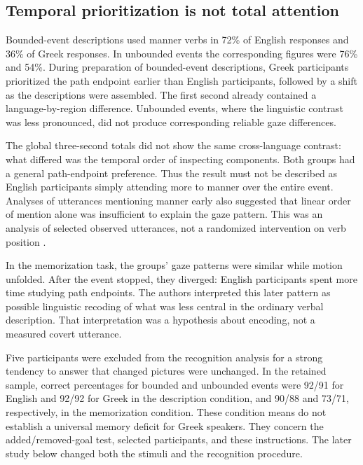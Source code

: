 \subsection{Temporal prioritization is not total attention}

Bounded-event descriptions used manner verbs in 72\% of English responses
and 36\% of Greek responses. In unbounded events the corresponding figures
were 76\% and 54\%. During preparation of bounded-event descriptions,
Greek participants prioritized the path endpoint earlier than English
participants, followed by a shift as the descriptions were assembled.
The first second already contained a language-by-region difference.
Unbounded events, where the linguistic contrast was less pronounced,
did not produce corresponding reliable gaze differences.

The global three-second totals did not show the same cross-language
contrast: what differed was the temporal order of inspecting components.
Both groups had a general path-endpoint preference. Thus the result must
not be described as English participants simply attending more to manner
over the entire event. Analyses of utterances mentioning manner early
also suggested that linear order of mention alone was insufficient to
explain the gaze pattern. This was an analysis of selected observed
utterances, not a randomized intervention on verb position
\cite[pp.~166--177,Table~1,Figs.~2--7]{PapafragouHulbertTrueswell2008EventPerceptionLC}.

In the memorization task, the groups' gaze patterns were similar while
motion unfolded. After the event stopped, they diverged: English
participants spent more time studying path endpoints. The authors
interpreted this later pattern as possible linguistic recoding of what
was less central in the ordinary verbal description. That interpretation
was a hypothesis about encoding, not a measured covert utterance.

Five participants were excluded from the recognition analysis for a strong
tendency to answer that changed pictures were unchanged. In the retained
sample, correct percentages for bounded and unbounded events were 92/91
for English and 92/92 for Greek in the description condition, and 90/88
and 73/71, respectively, in the memorization condition. These condition
means do not establish a universal memory deficit for Greek speakers.
They concern the added/removed-goal test, selected participants, and these
instructions. The later study below changed both the stimuli and the
recognition procedure.

